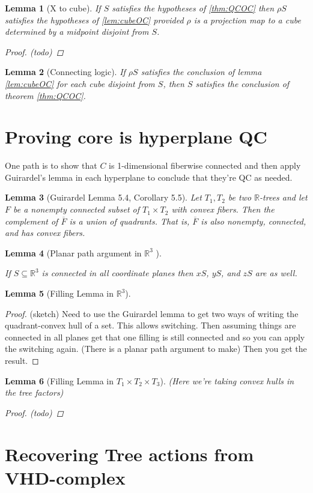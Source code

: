 \documentclass{article}
\theoremstyle{mystyle}
\newtheorem{lem}{Lemma}[section]
\theoremstyle{remark}
\begin{document}
\begin{lem}
	[\label{lem:Xtocube}X to cube]
	If \(S\) satisfies the hypotheses of \ref{thm:QCOC} then \(\rho S\) satisfies the hypotheses of \ref{lem:cubeOC} provided \(\rho\) is a projection map to a cube determined by a midpoint disjoint from \(S\).
\begin{proof}
	(todo)	
\end{proof}
\end{lem}

\begin{lem}
	[Connecting logic]
	If \(\rho S\) satisfies the conclusion of lemma \ref{lem:cubeOC} for each cube disjoint from \(S\), then \(S\) satisfies the conclusion of theorem \ref{thm:QCOC}.
\end{lem}


\section{Proving core is hyperplane QC}
One path is to show that \(C\) is 1-dimensional fiberwise connected and then apply Guirardel's lemma in each hyperplane to conclude that they're QC as needed.

\begin{lem}
	[Guirardel Lemma 5.4, Corollary 5.5]
	Let \(T_{1} , T_{2}\) be two \(\mathbb{R}\)-trees and let \(F\) be a nonempty connected subset of \(T_{1} \times T_{2}\) with convex fibers. Then the complement of \(\overline{F}\) is a union of quadrants. That is, \(\overline{F}\) is also nonempty, connected, and has convex fibers.
\end{lem}

\begin{lem}
	[Planar path argument in \(\mathbb{R}^{3}\) ]
	\label{lem:path}

	If \(S \subseteq \mathbb{R}^{3}\) is connected in all coordinate planes then \(xS\), \(yS\), and \(zS\) are as well. 
	

\end{lem}

\begin{lem}
    [Filling Lemma in \(\mathbb{R}^{3}\)]
	\label{lem:fillr3}
\end{lem}
\begin{proof}
    (sketch) Need to use the Guirardel lemma to get two ways of writing the quadrant-convex hull of a set. This allows switching. Then assuming things are connected in all planes get that one filling is still connected and so you can apply the switching again. (There is a planar path argument to make) Then you get the result.
\end{proof}
\begin{lem}
    [Filling Lemma in \(T_{1} \times T_{2} \times T_{3}\)]
	\label{lem:fillt3}
    (Here we're taking convex hulls in the tree factors)
\begin{proof}
    (todo)
\end{proof}
\end{lem}


\section{Recovering Tree actions from VHD-complex}
\end{document}
